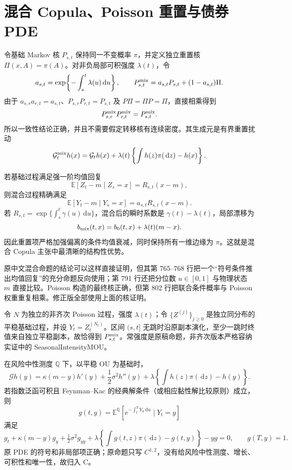 \documentclass[UTF8,11pt]{ctexart}
\newcommand{\E}{\mathbb E}
\newcommand{\dd}{\,\mathrm d}
\begin{document}
\section{混合 Copula、Poisson 重置与债券 PDE}

令基础 Markov 核 $P_{s,t}$ 保持同一不变概率 $\pi$，并定义独立重置核
$\Pi(x,A)=\pi(A)$。对非负局部可积强度 $\lambda(t)$，令
\[
a_{s,t}=\exp\!\left\{-\int_s^t\lambda(u)\dd u\right\},\qquad
P^{\rm mix}_{s,t}=a_{s,t}P_{s,t}+(1-a_{s,t})\Pi.
\]
由于 $a_{s,r}a_{r,t}=a_{s,t}$、$P_{s,r}P_{r,t}=P_{s,t}$ 及
$P\Pi=\Pi P=\Pi$，直接相乘得到
\[
P^{\rm mix}_{s,r}P^{\rm mix}_{r,t}=P^{\rm mix}_{s,t}.
\]
所以一致性结论正确，并且不需要假定转移核有连续密度。其生成元是有界重置扰动
\begin{equation}
\mathcal G_t^{\rm mix}h(x)=\mathcal G_t h(x)
+\lambda(t)\left\{\int h(z)\pi(\dd z)-h(x)\right\}.
\label{cmp:mixed-generator}
\end{equation}

若基础过程满足强一阶均值回复
\[
\E[Z_t-m\mid Z_s=x]=R_{s,t}(x-m),
\]
则混合过程精确满足
\begin{equation}
\E[Y_t-m\mid Y_s=x]=a_{s,t}R_{s,t}(x-m).
\label{cmp:mixed-mr}
\end{equation}
若 $R_{s,t}=\exp\{\int_s^t\gamma(u)\dd u\}$，混合后的瞬时系数是
$\gamma(t)-\lambda(t)$，局部漂移为
\[
b_{\rm mix}(t,x)=b_0(t,x)+\lambda(t)(m-x).
\]
因此重置项严格加强偏离的条件均值衰减，同时保持所有一维边缘为 $\pi$。这就是混合 Copula 主张中最清晰的结构性优势。

原中文混合命题的结论可以这样直接证明，但其第 765--768 行把一个“符号条件推出均值回复”的充分命题反向使用；第 791 行还把分位数 $u\in[0,1]$ 与物理状态 $m$ 直接比较。Poisson 构造的最终核正确，但第 802 行把联合条件概率与 Poisson 权重重复相乘。修正版全部使用上面的核证明。

令 $N$ 为独立的非齐次 Poisson 过程，强度 $\lambda(t)$；令
$\{Z^{(j)}\}_{j\ge0}$ 是独立同分布的平稳基础过程，并设
$Y_t=Z_t^{(N_t)}$。区间 $(s,t]$ 无跳时沿原副本演化，至少一跳时终值来自独立平稳副本，故恰得到 $P^{\rm mix}_{s,t}$。常强度是原稿命题，非齐次版本严格容纳实证中的 SeasonalIntensityMOU。

在风险中性测度 $\mathbb Q$ 下，以平稳 OU 为基础时，
\[
\mathcal G h(y)=\kappa(m-y)h'(y)+\frac12\sigma^2h''(y)
+\lambda\left\{\int h(z)\pi(\dd z)-h(y)\right\}.
\]
若指数泛函可积且 Feynman--Kac 的经典解条件（或相应黏性解比较原则）成立，则
\[
g(t,y)=\E^{\mathbb Q}\!\left[
e^{-\int_t^T Y_u\dd u}\mid Y_t=y\right]
\]
满足
\begin{equation}
g_t+\kappa(m-y)g_y+\tfrac12\sigma^2g_{yy}
+\lambda\left\{\int g(t,z)\pi(\dd z)-g(t,y)\right\}-yg=0,
\qquad g(T,y)=1.
\label{cmp:bond-pde}
\end{equation}
原 PDE 的符号和非局部项正确；原命题只写 $C^{1,2}$，没有给风险中性测度、增长、可积性和唯一性，故归入 C。
\end{document}
